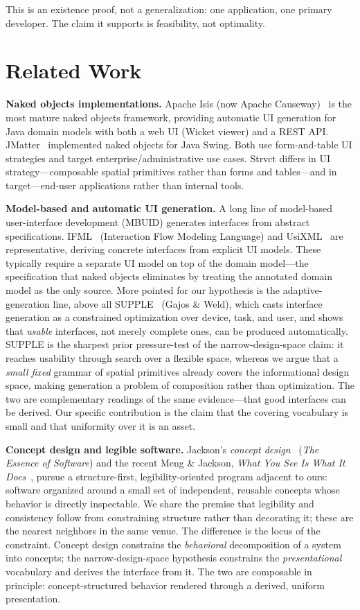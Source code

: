 \documentclass[sigplan,review,anonymous,10pt]{acmart}
\begin{document}
This is an existence proof, not a generalization: one application, one primary developer. The claim it supports is feasibility, not optimality.

\section{Related Work}
\label{sec:related}

\textbf{Naked objects implementations.} Apache Isis (now Apache Causeway)~\cite{causeway} is the most mature naked objects framework, providing automatic UI generation for Java domain models with both a web UI (Wicket viewer) and a REST API. JMatter~\cite{jmatter} implemented naked objects for Java Swing. Both use form-and-table UI strategies and target enterprise/administrative use cases. Strvct differs in UI strategy---composable spatial primitives rather than forms and tables---and in target---end-user applications rather than internal tools.

\textbf{Model-based and automatic UI generation.} A long line of model-based user-interface development (MBUID) generates interfaces from abstract specifications. IFML~\cite{ifml} (Interaction Flow Modeling Language) and UsiXML~\cite{usixml} are representative, deriving concrete interfaces from explicit UI models. These typically require a separate UI model on top of the domain model---the specification that naked objects eliminates by treating the annotated domain model as the only source. More pointed for our hypothesis is the adaptive-generation line, above all SUPPLE~\cite{supple2004,supple2010} (Gajos \& Weld), which casts interface generation as a constrained optimization over device, task, and user, and shows that \emph{usable} interfaces, not merely complete ones, can be produced automatically. SUPPLE is the sharpest prior pressure-test of the narrow-design-space claim: it reaches usability through search over a flexible space, whereas we argue that a \emph{small fixed} grammar of spatial primitives already covers the informational design space, making generation a problem of composition rather than optimization. The two are complementary readings of the same evidence---that good interfaces can be derived. Our specific contribution is the claim that the covering vocabulary is small and that uniformity over it is an asset.

\textbf{Concept design and legible software.} Jackson's \emph{concept design}~\cite{jackson2021} (\emph{The Essence of Software}) and the recent Meng \& Jackson, \emph{What You See Is What It Does}~\cite{mengjackson2025}, pursue a structure-first, legibility-oriented program adjacent to ours: software organized around a small set of independent, reusable concepts whose behavior is directly inspectable. We share the premise that legibility and consistency follow from constraining structure rather than decorating it; these are the nearest neighbors in the same venue. The difference is the locus of the constraint. Concept design constrains the \emph{behavioral} decomposition of a system into concepts; the narrow-design-space hypothesis constrains the \emph{presentational} vocabulary and derives the interface from it. The two are composable in principle: concept-structured behavior rendered through a derived, uniform presentation.
\end{document}
